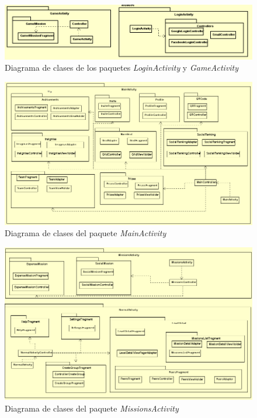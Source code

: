 \documentclass[twoside]{report}
\begin{document}
\begin{figure}[H]
\centering
\includegraphics[scale=0.7]{images/structureLoginGameModel}
\caption{Diagrama de clases de los paquetes \textit{LoginActivity} y \textit{GameActivity}}
\end{figure}

\begin{figure}[H]
\centering
\includegraphics[scale=0.6]{images/structureMainActivity}
\caption{Diagrama de clases del paquete \textit{MainActivity}}
\end{figure}

\begin{figure}[H]
\centering
\includegraphics[scale=0.7]{images/structureMissions}
\caption{Diagrama de clases del paquete \textit{MissionsActivity}}
\end{figure}
\end{document}
